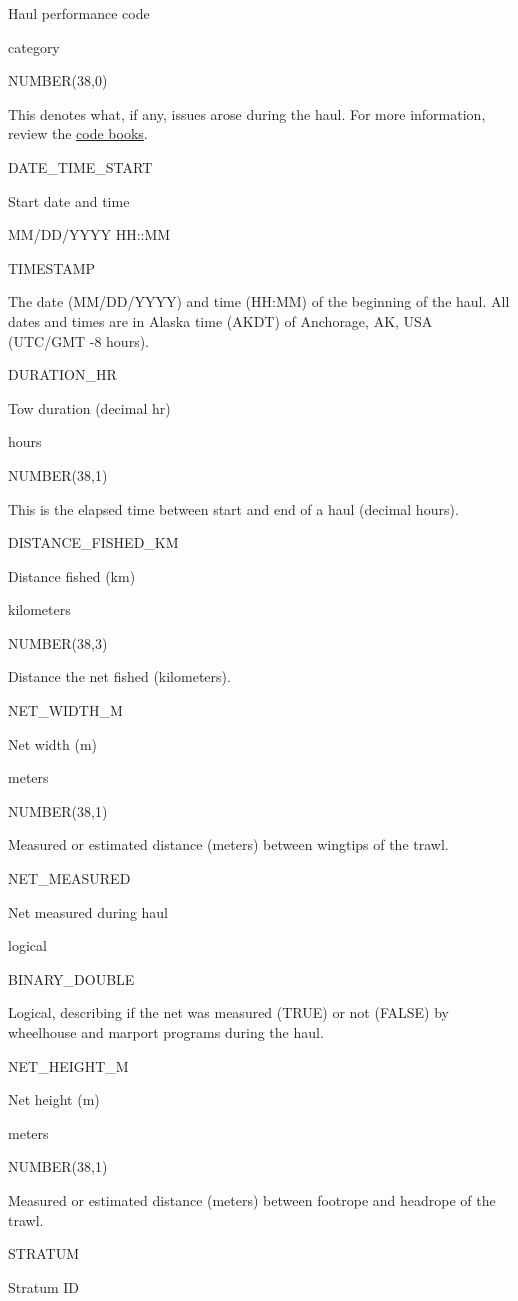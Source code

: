 \documentclass[
  letterpaper,
  oneside,
  open=any]{scrbook}
\begin{document}
Haul performance code

category

NUMBER(38,0)

This denotes what, if any, issues arose during the haul. For more
information, review the
\href{https://www.fisheries.noaa.gov/resource/document/groundfish-survey-species-code-manual-and-data-codes-manual}{code
books}.

DATE\_TIME\_START

Start date and time

MM/DD/YYYY HH::MM

TIMESTAMP

The date (MM/DD/YYYY) and time (HH:MM) of the beginning of the haul. All
dates and times are in Alaska time (AKDT) of Anchorage, AK, USA (UTC/GMT
-8 hours).

DURATION\_HR

Tow duration (decimal hr)

hours

NUMBER(38,1)

This is the elapsed time between start and end of a haul (decimal
hours).

DISTANCE\_FISHED\_KM

Distance fished (km)

kilometers

NUMBER(38,3)

Distance the net fished (kilometers).

NET\_WIDTH\_M

Net width (m)

meters

NUMBER(38,1)

Measured or estimated distance (meters) between wingtips of the trawl.

NET\_MEASURED

Net measured during haul

logical

BINARY\_DOUBLE

Logical, describing if the net was measured (TRUE) or not (FALSE) by
wheelhouse and marport programs during the haul.

NET\_HEIGHT\_M

Net height (m)

meters

NUMBER(38,1)

Measured or estimated distance (meters) between footrope and headrope of
the trawl.

STRATUM

Stratum ID
\end{document}
